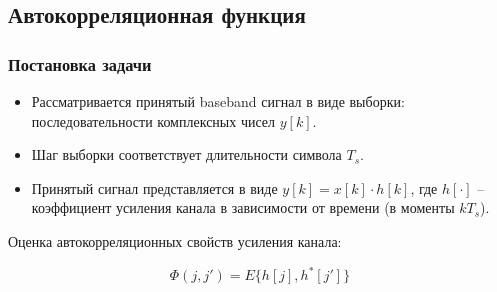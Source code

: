 \documentclass[utf8]{beamer}
\begin{document}
\subsection{Автокорреляционная функция}
\begin{frame}
\frametitle{Постановка задачи}
\begin{itemize}
        \item Рассматривается принятый baseband сигнал в виде выборки: последовательности комплексных чисел $y[k]$.
        \item Шаг выборки соответствует длительности символа $T_s$.
        \item Принятый сигнал представляется в виде $y[k] = x[k]\cdot h[k]$, где $h[\cdot]$ -- коэффициент усиления канала в зависимости от времени (в моменты $kT_s$).
\end{itemize}
\begin{block}{Оценка автокорреляционных свойств усиления канала:}
\begin{center}
$$\Phi(j, j') = E\{h[j], h^{\ast}[j']\}$$
\end{center}
\end{block}
\end{frame}
\end{document}
